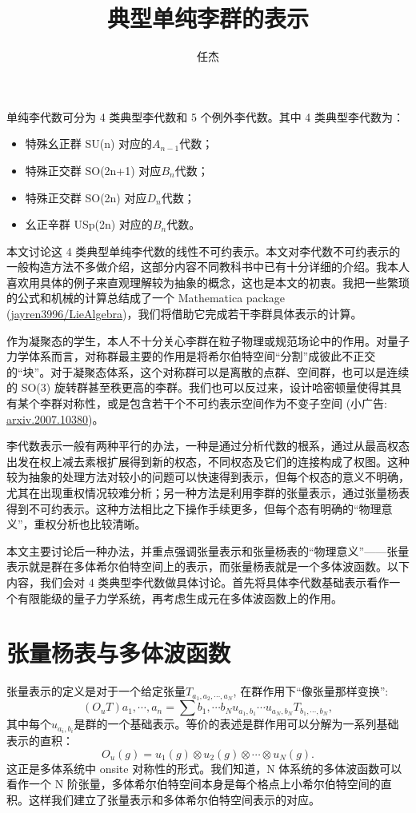 \documentclass[UTF8]{ctexart}
\begin{document}
\title{典型单纯李群的表示}
\date{任杰}

\maketitle
\noindent 单纯李代数可分为 4 类典型李代数和 5 个例外李代数。其中 4 类典型李代数为：
\begin{itemize}
	\item 特殊幺正群 SU(n) 对应的$A_{n-1}$代数；
	\item 特殊正交群 SO(2n+1) 对应$B_n$代数；
	\item 特殊正交群 SO(2n) 对应$D_n$代数；
	\item 幺正辛群 USp(2n) 对应的$B_n$代数。
\end{itemize}
本文讨论这 4 类典型单纯李代数的线性不可约表示。本文对李代数不可约表示的一般构造方法不多做介绍，这部分内容不同教科书中已有十分详细的介绍。我本人喜欢用具体的例子来直观理解较为抽象的概念，这也是本文的初衷。我把一些繁琐的公式和机械的计算总结成了一个 Mathematica package (\href{https://github.com/jayren3996/LieAlgebra}{jayren3996/LieAlgebra})，我们将借助它完成若干李群具体表示的计算。

作为凝聚态的学生，本人不十分关心李群在粒子物理或规范场论中的作用。对量子力学体系而言，对称群最主要的作用是将希尔伯特空间“分割”成彼此不正交的“块”。对于凝聚态体系，这个对称群可以是离散的点群、空间群，也可以是连续的 SO(3) 旋转群甚至秩更高的李群。我们也可以反过来，设计哈密顿量使得其具有某个李群对称性，或是包含若干个不可约表示空间作为不变子空间 (小广告: \href{https://arxiv.org/abs/2007.10380}{arxiv.2007.10380})。

李代数表示一般有两种平行的办法，一种是通过分析代数的根系，通过从最高权态出发在权上减去素根扩展得到新的权态，不同权态及它们的连接构成了权图。这种较为抽象的处理方法对较小的问题可以快速得到表示，但每个权态的意义不明确，尤其在出现重权情况较难分析；另一种方法是利用李群的张量表示，通过张量杨表得到不可约表示。这种方法相比之下操作手续更多，但每个态有明确的“物理意义”，重权分析也比较清晰。

本文主要讨论后一种办法，并重点强调张量表示和张量杨表的“物理意义”——张量表示就是群在多体希尔伯特空间上的表示，而张量杨表就是一个多体波函数。以下内容，我们会对 4 类典型李代数做具体讨论。首先将具体李代数基础表示看作一个有限能级的量子力学系统，再考虑生成元在多体波函数上的作用。

\section*{张量杨表与多体波函数}
\noindent 张量表示的定义是对于一个给定张量$T_{a_1,a_2,\cdots,a_N}$, 在群作用下“像张量那样变换”:
\begin{equation}
	(O_uT){a_1,\cdots,a_n} = \sum{b_1,\cdots b_N} u_{a_1,b_1}\cdots u_{a_N,b_N} T_{b_1,\cdots,b_N}, 
\end{equation}
其中每个$u_{a_i,b_i}$是群的一个基础表示。等价的表述是群作用可以分解为一系列基础表示的直积：
\begin{equation}
	O_u(g) = u_1(g)\otimes u_2(g) \otimes \cdots \otimes u_N(g).
\end{equation}
这正是多体系统中 onsite 对称性的形式。我们知道，N 体系统的多体波函数可以看作一个 N 阶张量，多体希尔伯特空间本身是每个格点上小希尔伯特空间的直积。这样我们建立了张量表示和多体希尔伯特空间表示的对应。
\end{document}
